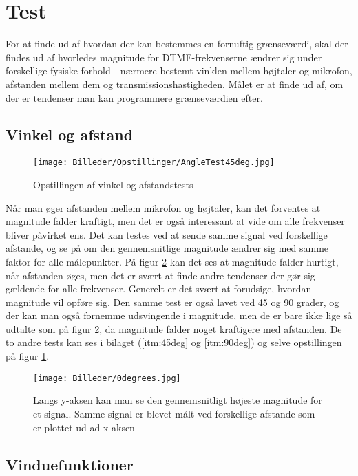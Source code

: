 \section{Test}

For at finde ud af hvordan der kan bestemmes en fornuftig grænseværdi, skal der findes ud af hvorledes magnitude for DTMF-frekvenserne ændrer sig under forskellige fysiske forhold - nærmere bestemt vinklen mellem højtaler og mikrofon, afstanden mellem dem og transmissionshastigheden. Målet er at finde ud af, om der er tendenser man kan programmere grænseværdien efter. 

\subsection{Vinkel og afstand} \label{sec:afstand}

\begin{figure}[h!]
\centering
\texttt{[image: Billeder/Opstillinger/AngleTest45deg.jpg]}
\caption{Opstillingen af vinkel og afstandstests}
\label{fig:opstilling}
\end{figure} 

Når man øger afstanden mellem mikrofon og højtaler, kan det forventes at magnitude falder kraftigt, men det er også interessant at vide om alle frekvenser bliver påvirket ens. Det kan testes ved at sende samme signal ved forskellige afstande, og se på om den gennemsnitlige magnitude ændrer sig med samme faktor for alle målepunkter. På figur \ref{fig:degrees} kan det ses at magnitude falder hurtigt, når afstanden øges, men det er svært at finde andre tendenser der gør sig gældende for alle frekvenser. Generelt er det svært at forudsige, hvordan magnitude vil opføre sig. Den samme test er også lavet ved 45 og 90 grader, og der kan man også fornemme udsvingende i magnitude, men de er bare ikke lige så udtalte som på figur \ref{fig:degrees}, da magnitude falder noget kraftigere med afstanden. De to andre tests kan ses i bilaget (\ref{itm:45deg} og \ref{itm:90deg}) og selve opstillingen på figur \ref{fig:opstilling}.

\begin{figure}[h!]
\centering
\texttt{[image: Billeder/0degrees.jpg]}
\caption{Langs y-aksen kan man se den gennemsnitligt højeste magnitude for et signal. Samme signal er blevet målt ved forskellige afstande som er plottet ud ad x-aksen}
\label{fig:degrees}
\end{figure} 

\subsection{Vinduefunktioner} \label{sec:Windowfunction}


